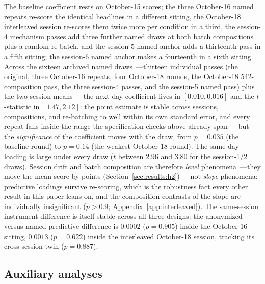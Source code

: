 The baseline coefficient rests on October-15 scores; the three October-16 named repeats re-score the identical headlines in a different sitting, the October-18 interleaved session re-scores them twice more per condition in a third, the session-4 mechanism passes add three further named draws at both batch compositions plus a random re-batch, and the session-5 named anchor adds a thirteenth pass in a fifth sitting; the session-6 named anchor makes a fourteenth in a sixth sitting. Across the sixteen archived named draws~---thirteen individual passes (the original, three October-16 repeats, four October-18 rounds, the October-18 542-composition pass, the three session-4 passes, and the session-5 named pass) plus the two session means~---the next-day coefficient lives in $[0.010, 0.016]$ and the $t$-statistic in $[1.47, 2.12]$: the point estimate is stable across sessions, compositions, and re-batching to well within its own standard error, and every repeat falls inside the range the specification checks above already span~---but the \emph{significance} of the coefficient moves with the draw, from $p=0.035$ (the baseline round) to $p=0.14$ (the weakest October-18 round). The same-day loading is large under every draw ($t$ between $2.96$ and $3.80$ for the session-1/2 draws). Session drift and batch composition are therefore \emph{level} phenomena~---they move the mean score by points (Section~\ref{sec:results:h2})~---not \emph{slope} phenomena: predictive loadings survive re-scoring, which is the robustness fact every other result in this paper leans on, and the composition contrasts of the slope are individually insignificant ($p>0.9$; Appendix~\ref{app:interleaved}). The same-session instrument difference is itself stable across all three designs: the anonymized-versus-named predictive difference is $0.0002$ ($p=0.905$) inside the October-16 sitting, $0.0013$ ($p=0.622$) inside the interleaved October-18 session, tracking its cross-session twin ($p=0.887$).

\subsection{Auxiliary analyses}
\label{sec:robust:aux}

